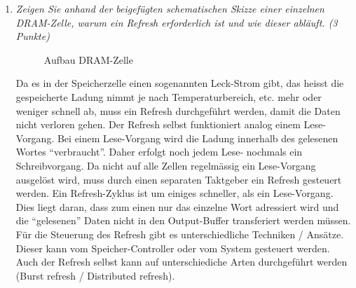 \documentclass[10pt]{article}
\begin{document}
\begin{enumerate}[label=\alph*)]
	\item
		\textit{Zeigen Sie anhand der beigefügten schematischen Skizze einer einzelnen DRAM-Zelle, warum ein Refresh erforderlich ist und wie dieser abläuft. (3 Punkte)}
		
	\begin{figure}[htbp]
		\centering \leavevmode
		\epsfxsize=150pt
		\caption{Aufbau DRAM-Zelle}
	\end{figure}
Da es in der Speicherzelle einen sogenannten Leck-Strom gibt, das heisst die gespeicherte Ladung nimmt je nach Temperaturbereich, etc. mehr oder weniger schnell ab, muss ein Refresh durchgeführt werden, damit die Daten nicht verloren gehen. Der Refresh selbst funktioniert analog einem Lese-Vorgang. Bei einem Lese-Vorgang wird die Ladung innerhalb des gelesenen Wortes "`verbraucht"'. Daher erfolgt noch jedem Lese- nochmals ein Schreibvorgang. Da nicht auf alle Zellen regelmässig ein Lese-Vorgang ausgelöst wird, muss durch einen separaten Taktgeber ein Refresh gesteuert werden. Ein Refresh-Zyklus ist um einiges schneller, als ein Lese-Vorgang. Dies liegt daran, dass zum einen nur das einzelne Wort adressiert wird und die "`gelesenen"' Daten nicht in den Output-Buffer transferiert werden müssen. Für die Steuerung des Refresh gibt es unterschiedliche Techniken / Ansätze. Dieser kann vom Speicher-Controller oder vom System gesteuert werden. Auch der Refresh selbst kann auf unterschiediche Arten durchgeführt werden (Burst refresh / Distributed refresh).
	
\end{enumerate}
\end{document}

